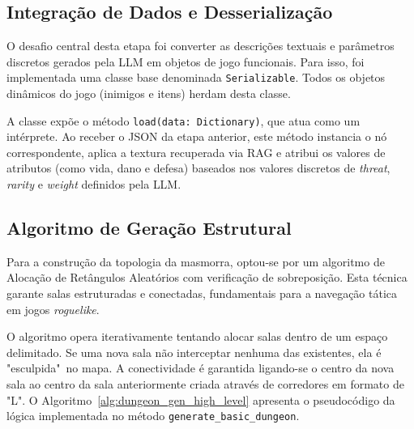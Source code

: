 \subsection{Integração de Dados e Desserialização}

O desafio central desta etapa foi converter as descrições textuais e parâmetros
discretos gerados pela \gls{LLM} em objetos de jogo funcionais. Para isso, foi
implementada uma classe base denominada \texttt{Serializable}. Todos os objetos
dinâmicos do jogo (inimigos e itens) herdam desta classe.

A classe expõe o método \texttt{load(data: Dictionary)}, que atua como um
intérprete. Ao receber o \gls{JSON} da etapa anterior, este método instancia o nó
correspondente, aplica a textura recuperada via \gls{RAG} e atribui os valores de
atributos (como vida, dano e defesa) baseados nos valores discretos de
\textit{threat}, \textit{rarity} e \textit{weight} definidos pela \gls{LLM}.

\subsection{Algoritmo de Geração Estrutural}

Para a construção da topologia da masmorra, optou-se por um algoritmo de
Alocação de Retângulos Aleatórios com verificação de sobreposição. Esta técnica
garante salas estruturadas e conectadas, fundamentais para a navegação tática em
jogos \textit{roguelike}.

O algoritmo opera iterativamente tentando alocar salas dentro de um espaço
delimitado. Se uma nova sala não interceptar nenhuma das existentes, ela é
"esculpida"\ no mapa. A conectividade é garantida ligando-se o centro da nova
sala ao centro da sala anteriormente criada através de corredores em formato de
"L". O Algoritmo~\ref{alg:dungeon_gen_high_level} apresenta o pseudocódigo da
lógica implementada no método \texttt{generate\_basic\_dungeon}.

